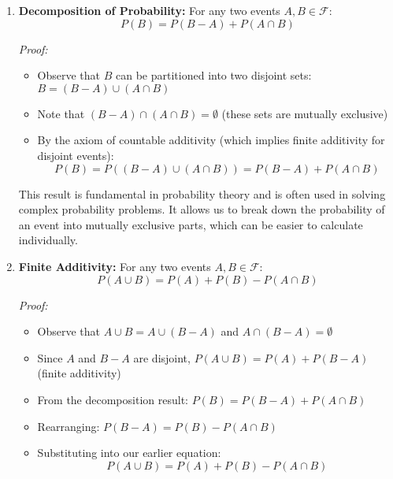 \documentclass{article}
\begin{document}
\begin{enumerate}  
    \item \textbf{Decomposition of Probability:} For any two events \(A, B \in \mathcal{F}\):
    \[
        P(B) = P(B - A) + P(A \cap B)
    \]

    \textit{Proof:} 
    \begin{itemize}
        \item Observe that \(B\) can be partitioned into two disjoint sets: \(B = (B - A) \cup (A \cap B)\)
        \item Note that \((B - A) \cap (A \cap B) = \emptyset\) (these sets are mutually exclusive)
        \item By the axiom of countable additivity (which implies finite additivity for disjoint events):
        \[P(B) = P((B - A) \cup (A \cap B)) = P(B - A) + P(A \cap B)\]
    \end{itemize}

    This result is fundamental in probability theory and is often used in solving complex probability problems. 
    It allows us to break down the probability of an event into mutually exclusive parts, which can be easier to calculate individually.

    \begin{center}
    \end{center}


    \item \textbf{Finite Additivity:} For any two events \(A, B \in \mathcal{F}\):
    \[
        P(A \cup B) = P(A) + P(B) - P(A \cap B)
    \]

    \textit{Proof:}
    \begin{itemize}
        \item Observe that \(A \cup B = A \cup (B - A)\) and \(A \cap (B - A) = \emptyset\)
        \item Since \(A\) and \(B - A\) are disjoint, \(P(A \cup B) = P(A) + P(B - A)\) (finite additivity)
        \item From the decomposition result: \(P(B) = P(B - A) + P(A \cap B)\)
        \item Rearranging: \(P(B - A) = P(B) - P(A \cap B)\)
        \item Substituting into our earlier equation:
              \[P(A \cup B) = P(A) + P(B) - P(A \cap B)\]
    \end{itemize}
    

\end{enumerate}
\end{document}
